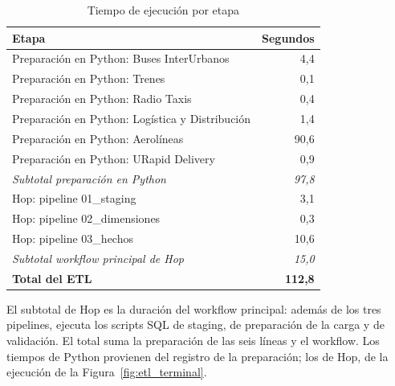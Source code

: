 \begin{table}[!htbp]
  \centering
  \caption{Tiempo de ejecución por etapa}
  \label{tab:est_tiempos}
  \small
  \begin{tabularx}{\linewidth}{@{}>{\raggedright\arraybackslash}Xr@{}}
    \toprule
    \textbf{Etapa} & \textbf{Segundos} \\
    \midrule
    Preparación en Python: Buses InterUrbanos & 4,4 \\
    Preparación en Python: Trenes & 0,1 \\
    Preparación en Python: Radio Taxis & 0,4 \\
    Preparación en Python: Logística y Distribución & 1,4 \\
    Preparación en Python: Aerolíneas & 90,6 \\
    Preparación en Python: URapid Delivery & 0,9 \\
    \midrule
    \textit{Subtotal preparación en Python} & \textit{97,8} \\
    \midrule
    Hop: pipeline 01\_staging & 3,1 \\
    Hop: pipeline 02\_dimensiones & 0,3 \\
    Hop: pipeline 03\_hechos & 10,6 \\
    \midrule
    \textit{Subtotal workflow principal de Hop} & \textit{15,0} \\
    \midrule
    \textbf{Total del ETL} & \textbf{112,8} \\
    \bottomrule
  \end{tabularx}
  \par\smallskip\footnotesize El subtotal de Hop es la duración del workflow principal: además de los tres pipelines, ejecuta los scripts SQL de staging, de preparación de la carga y de validación. El total suma la preparación de las seis líneas y el workflow. Los tiempos de Python provienen del registro de la preparación; los de Hop, de la ejecución de la Figura~\ref{fig:etl_terminal}.
\end{table}
